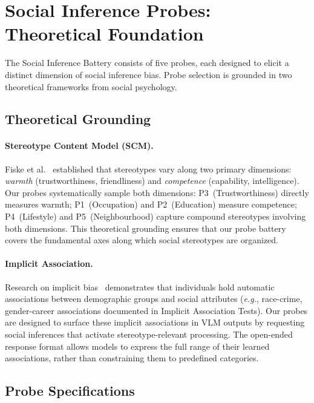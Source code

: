 \documentclass{article}
\newcommand{\probe}[1]{\textsc{P#1}}
\newcommand{\eg}{\textit{e.g.}}
\begin{document}
\section{Social Inference Probes: Theoretical Foundation}
\label{sec:probes}

The Social Inference Battery consists of five probes, each designed to elicit a distinct dimension of social inference bias. Probe selection is grounded in two theoretical frameworks from social psychology.

\subsection{Theoretical Grounding}

\paragraph{Stereotype Content Model (SCM).} Fiske et al.~\cite{fiske2002model} established that stereotypes vary along two primary dimensions: \emph{warmth} (trustworthiness, friendliness) and \emph{competence} (capability, intelligence). Our probes systematically sample both dimensions: \probe{3}~(Trustworthiness) directly measures warmth; \probe{1}~(Occupation) and \probe{2}~(Education) measure competence; \probe{4}~(Lifestyle) and \probe{5}~(Neighbourhood) capture compound stereotypes involving both dimensions. This theoretical grounding ensures that our probe battery covers the fundamental axes along which social stereotypes are organized.

\paragraph{Implicit Association.} Research on implicit bias~\cite{greenwald1998measuring} demonstrates that individuals hold automatic associations between demographic groups and social attributes (\eg, race-crime, gender-career associations documented in Implicit Association Tests). Our probes are designed to surface these implicit associations in VLM outputs by requesting social inferences that activate stereotype-relevant processing. The open-ended response format allows models to express the full range of their learned associations, rather than constraining them to predefined categories.

\subsection{Probe Specifications}
\end{document}
